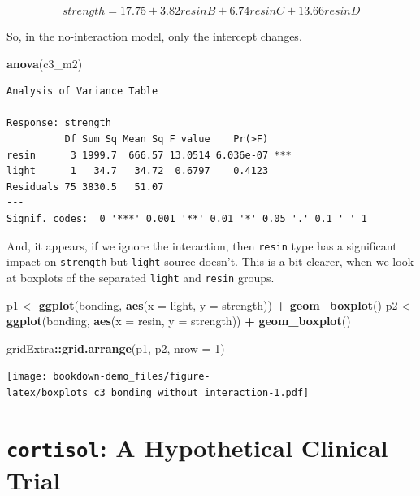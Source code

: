 \documentclass[]{book}
\newenvironment{Shaded}{\begin{snugshade}}{\end{snugshade}}
\newcommand{\KeywordTok}[1]{\textcolor[rgb]{0.13,0.29,0.53}{\textbf{#1}}}
\newcommand{\DataTypeTok}[1]{\textcolor[rgb]{0.13,0.29,0.53}{#1}}
\newcommand{\DecValTok}[1]{\textcolor[rgb]{0.00,0.00,0.81}{#1}}
\newcommand{\StringTok}[1]{\textcolor[rgb]{0.31,0.60,0.02}{#1}}
\newcommand{\OperatorTok}[1]{\textcolor[rgb]{0.81,0.36,0.00}{\textbf{#1}}}
\newcommand{\NormalTok}[1]{#1}
\theoremstyle{definition}
\theoremstyle{definition}
\theoremstyle{definition}
\theoremstyle{remark}
\begin{document}
\[
strength = 17.75 + 3.82 resinB + 6.74 resinC + 13.66 resinD
\]

So, in the no-interaction model, only the intercept changes.

\begin{Shaded}
\begin{Highlighting}[]
\KeywordTok{anova}\NormalTok{(c3_m2)}
\end{Highlighting}
\end{Shaded}

\begin{verbatim}
Analysis of Variance Table

Response: strength
          Df Sum Sq Mean Sq F value    Pr(>F)    
resin      3 1999.7  666.57 13.0514 6.036e-07 ***
light      1   34.7   34.72  0.6797    0.4123    
Residuals 75 3830.5   51.07                      
---
Signif. codes:  0 '***' 0.001 '**' 0.01 '*' 0.05 '.' 0.1 ' ' 1
\end{verbatim}

And, it appears, if we ignore the interaction, then \texttt{resin} type
has a significant impact on \texttt{strength} but \texttt{light} source
doesn't. This is a bit clearer, when we look at boxplots of the
separated \texttt{light} and \texttt{resin} groups.

\begin{Shaded}
\begin{Highlighting}[]
\NormalTok{p1 <-}\StringTok{ }\KeywordTok{ggplot}\NormalTok{(bonding, }\KeywordTok{aes}\NormalTok{(}\DataTypeTok{x =}\NormalTok{ light, }\DataTypeTok{y =}\NormalTok{ strength)) }\OperatorTok{+}\StringTok{ }
\StringTok{    }\KeywordTok{geom_boxplot}\NormalTok{()}
\NormalTok{p2 <-}\StringTok{ }\KeywordTok{ggplot}\NormalTok{(bonding, }\KeywordTok{aes}\NormalTok{(}\DataTypeTok{x =}\NormalTok{ resin, }\DataTypeTok{y =}\NormalTok{ strength)) }\OperatorTok{+}
\StringTok{    }\KeywordTok{geom_boxplot}\NormalTok{()}

\NormalTok{gridExtra}\OperatorTok{::}\KeywordTok{grid.arrange}\NormalTok{(p1, p2, }\DataTypeTok{nrow =} \DecValTok{1}\NormalTok{)}
\end{Highlighting}
\end{Shaded}

\texttt{[image: bookdown-demo\_files/figure-latex/boxplots\_c3\_bonding\_without\_interaction-1.pdf]}

\section{\texorpdfstring{\texttt{cortisol}: A Hypothetical Clinical
Trial}{cortisol: A Hypothetical Clinical Trial}}\label{cortisol-a-hypothetical-clinical-trial}
\end{document}

